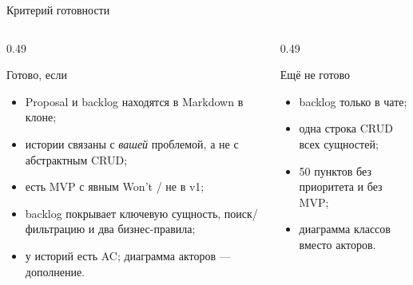 \begin{frame}{Критерий готовности}
  \vspace{0.1em}
  \scriptsize
  \begin{columns}[T]
    \begin{column}{0.49\textwidth}
      \begin{block}{Готово, если}
        \begin{itemize}\setlength\itemsep{0.12em}
          \item Proposal и backlog находятся в Markdown в клоне;
          \item истории связаны с \emph{вашей} проблемой,
                а не с абстрактным CRUD;
          \item есть MVP с явным Won't / \flqq не в v1\frqq;
          \item backlog покрывает ключевую сущность,
                поиск/фильтрацию и два бизнес-правила;
          \item у историй есть AC; диаграмма акторов --- дополнение.
        \end{itemize}
      \end{block}
    \end{column}
    \begin{column}{0.49\textwidth}
      \begin{block}{Ещё не готово}
        \begin{itemize}\setlength\itemsep{0.12em}
          \item backlog только в чате;
          \item одна строка \flqq CRUD всех сущностей\frqq;
          \item 50 пунктов без приоритета и без MVP;
          \item диаграмма классов вместо акторов.
        \end{itemize}
      \end{block}
    \end{column}
  \end{columns}
\end{frame}
